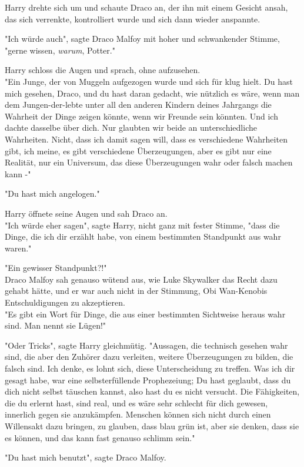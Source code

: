 {Harry drehte sich um und schaute Draco an, der ihn mit einem Gesicht ansah, das sich verrenkte, kontrolliert wurde und sich dann wieder anspannte.

"Ich würde auch", sagte Draco Malfoy mit hoher und schwankender Stimme, "gerne wissen, \emph{warum}, Potter."

Harry schloss die Augen und sprach, ohne aufzusehen.\\ "Ein Junge, der von Muggeln aufgezogen wurde und sich für klug hielt. Du hast mich gesehen, Draco, und du hast daran gedacht, wie nützlich es wäre, wenn man dem Jungen-der-lebte unter all den anderen Kindern deines Jahrgangs die Wahrheit der Dinge zeigen könnte, wenn wir Freunde sein könnten. Und ich dachte dasselbe über dich. Nur glaubten wir beide an unterschiedliche Wahrheiten. Nicht, dass ich damit sagen will, dass es verschiedene Wahrheiten gibt, ich meine, es gibt verschiedene Überzeugungen, aber es gibt nur eine Realität, nur ein Universum, das diese Überzeugungen wahr oder falsch machen kann -"

"Du hast mich angelogen."

Harry öffnete seine Augen und sah Draco an.\\ "Ich würde eher sagen", sagte Harry, nicht ganz mit fester Stimme, "dass die Dinge, die ich dir erzählt habe, von einem bestimmten Standpunkt aus wahr waren."

"Ein gewisser Standpunkt?!"\\ Draco Malfoy sah genauso wütend aus, wie Luke Skywalker das Recht dazu gehabt hätte, und er war auch nicht in der Stimmung, Obi Wan-Kenobis Entschuldigungen zu akzeptieren.\\ "Es gibt ein Wort für Dinge, die aus einer bestimmten Sichtweise heraus wahr sind. Man nennt sie Lügen!"

"Oder Tricks", sagte Harry gleichmütig. "Aussagen, die technisch gesehen wahr sind, die aber den Zuhörer dazu verleiten, weitere Überzeugungen zu bilden, die falsch sind. Ich denke, es lohnt sich, diese Unterscheidung zu treffen. Was ich dir gesagt habe, war eine selbsterfüllende Prophezeiung; Du hast geglaubt, dass du dich nicht selbst täuschen kannst, also hast du es nicht versucht. Die Fähigkeiten, die du erlernt hast, sind real, und es wäre sehr schlecht für dich gewesen, innerlich gegen sie anzukämpfen. Menschen können sich nicht durch einen Willensakt dazu bringen, zu glauben, dass blau grün ist, aber sie denken, dass sie es können, und das kann fast genauso schlimm sein."

"Du hast mich benutzt", sagte Draco Malfoy.

}
